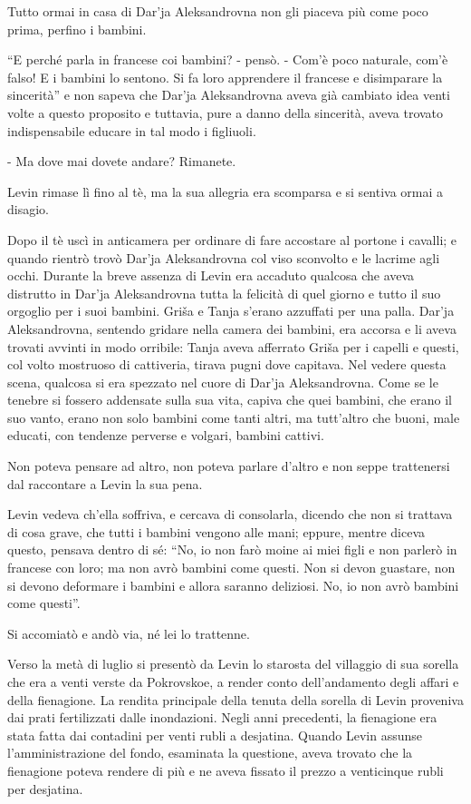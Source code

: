 Tutto ormai in casa di Dar'ja Aleksandrovna non gli piaceva più come poco prima, perfino i bambini. 

``E perché parla in francese coi bambini? - pensò. - Com'è poco naturale, com'è falso! E i bambini lo sentono. Si fa loro apprendere il francese e disimparare la sincerità'' e non sapeva che Dar'ja Aleksandrovna aveva già cambiato idea venti volte a questo proposito e tuttavia, pure a danno della sincerità, aveva trovato indispensabile educare in tal modo i figliuoli. 

- Ma dove mai dovete andare? Rimanete. 

Levin rimase lì fino al tè, ma la sua allegria era scomparsa e si sentiva ormai a disagio. 

Dopo il tè uscì in anticamera per ordinare di fare accostare al portone i cavalli; e quando rientrò trovò Dar'ja Aleksandrovna col viso sconvolto e le lacrime agli occhi. Durante la breve assenza di Levin era accaduto qualcosa che aveva distrutto in Dar'ja Aleksandrovna tutta la felicità di quel giorno e tutto il suo orgoglio per i suoi bambini. Griša e Tanja s'erano azzuffati per una palla. Dar'ja Aleksandrovna, sentendo gridare nella camera dei bambini, era accorsa e li aveva trovati avvinti in modo orribile: Tanja aveva afferrato Griša per i capelli e questi, col volto mostruoso di cattiveria, tirava pugni dove capitava. Nel vedere questa scena, qualcosa si era spezzato nel cuore di Dar'ja Aleksandrovna. Come se le tenebre si fossero addensate sulla sua vita, capiva che quei bambini, che erano il suo vanto, erano non solo bambini come tanti altri, ma tutt'altro che buoni, male educati, con tendenze perverse e volgari, bambini cattivi. 

Non poteva pensare ad altro, non poteva parlare d'altro e non seppe trattenersi dal raccontare a Levin la sua pena. 

Levin vedeva ch'ella soffriva, e cercava di consolarla, dicendo che non si trattava di cosa grave, che tutti i bambini vengono alle mani; eppure, mentre diceva questo, pensava dentro di sé: ``No, io non farò moine ai miei figli e non parlerò in francese con loro; ma non avrò bambini come questi. Non si devon guastare, non si devono deformare i bambini e allora saranno deliziosi. No, io non avrò bambini come questi''. 

Si accomiatò e andò via, né lei lo trattenne. 

Verso la metà di luglio si presentò da Levin lo starosta del villaggio di sua sorella che era a venti verste da Pokrovskoe, a render conto dell'andamento degli affari e della fienagione. La rendita principale della tenuta della sorella di Levin proveniva dai prati fertilizzati dalle inondazioni. Negli anni precedenti, la fienagione era stata fatta dai contadini per venti rubli a desjatina. Quando Levin assunse l'amministrazione del fondo, esaminata la questione, aveva trovato che la fienagione poteva rendere di più e ne aveva fissato il prezzo a venticinque rubli per desjatina. 

